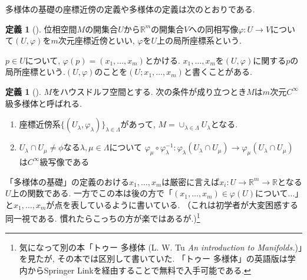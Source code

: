 \documentclass[dvipdfmx,a4paper,11pt]{article}
\newcommand{\R}{\mathbb{R}}
\theoremstyle{definition}
\newtheorem{dfn}[thm]{定義}
\begin{document}
多様体の基礎の座標近傍の定義や多様体の定義は次のとおりである.
\begin{tcolorbox}[
    colback = white,
    colframe = green!35!black,
    fonttitle = \bfseries,
    breakable = true]
    \begin{dfn}[]
    \label{defn_local}
    位相空間$M$の開集合$U$から$\R^m$の開集合$V$への同相写像$\varphi : U \rightarrow V$について$(U, \varphi)$を$m$次元座標近傍といい, $\varphi$を$U$上の局所座標系という. 
    
    $p \in U$について, $\varphi(p) =(x_1, \ldots, x_m)$とかける. $x_1, \ldots, x_m$を$(U, \varphi)$に関する$p$の局所座標という.$(U, \varphi)$のことを$(U; x_1, \ldots, x_m)$と書くことがある. 
    \end{dfn}
    \end{tcolorbox}
    \begin{tcolorbox}[
    colback = white,
    colframe = green!35!black,
    fonttitle = \bfseries,
    breakable = true]
    \begin{dfn}[]
    $M$をハウスドルフ空間とする. 次の条件が成り立つとき$M$は$m$次元$C^{\infty}$級多様体と呼ばれる.
     \begin{enumerate}
     \setlength{\parskip}{0cm}
  \setlength{\itemsep}{2pt} 
     \item 座標近傍系$\{(U_\lambda, \varphi_\lambda)\}_{\lambda \in\Lambda}$があって, $M = \cup_{\lambda \in \Lambda} U_{\lambda}$となる. 
     \item $U_\lambda \cap U_\mu \neq \phi$なる$\lambda, \mu \in \Lambda$について
    $
   \varphi_\mu\circ \varphi_{\lambda}^{-1} : \varphi_{\lambda}(U_\lambda \cap U_\mu) \rightarrow \varphi_{\mu}(U_\lambda \cap U_\mu) 
    $
    は$C^{\infty}$級写像である
     \end{enumerate}


    \end{dfn}
    \end{tcolorbox}   
    
「多様体の基礎」の定義のおける$ x_1, \ldots, x_m$は厳密に言えば$x_i : U \rightarrow \R^m \rightarrow \R$となる$U$上の関数である. 一方でこの本は後の方で「$(x_1, \ldots, x_m) \in \varphi(U)$について...」と$ x_1, \ldots, x_m$が点を表しているように書いている. （これは初学者が大変困惑する同一視である. 慣れたらこっちの方が楽ではあるが.)\footnote{気になって別の本「トゥー 多様体 (L. W. Tu \textit{An introduction to Manifolds.})」を見たが, その本では区別して書いていた. 「トゥー 多様体」の英語版は学内からSpringer Linkを経由することで無料で入手可能である.} 
\end{document}
